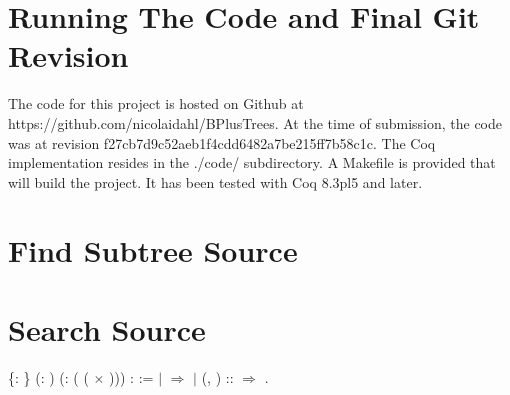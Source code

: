 \appendix
\label{sec:Appendix}
\section{Running The Code and Final Git Revision}
The code for this project is hosted on Github at \\ https://github.com/nicolaidahl/BPlusTrees. At the time of submission, the code was at revision f27cb7d9c52aeb1f4cdd6482a7be215ff7b58c1c. The Coq implementation resides in the ./code/ subdirectory. A Makefile is provided that will build the project. It has been tested with Coq 8.3pl5 and later.

\newpage

\section{Find Subtree Source}
\label{sec:findSubtree}


\section{Search Source}
\label{sec:SearchSource}

\begin{coqdoccode}
  \{: \} (: ) (: ( ( \ensuremath{\times} ))) :   :=\coqdoceol
\coqdocindent{1.00em}
  \coqdoceol
\coqdocindent{2.00em}
\ensuremath{|}  \ensuremath{\Rightarrow} \coqdoceol
\coqdocindent{2.00em}
\ensuremath{|} (, ) ::  \ensuremath{\Rightarrow}           \coqdoceol
\coqdocindent{1.00em}
.\coqdoceol
\coqdocemptyline
\coqdocnoindent
\end{coqdoccode}



